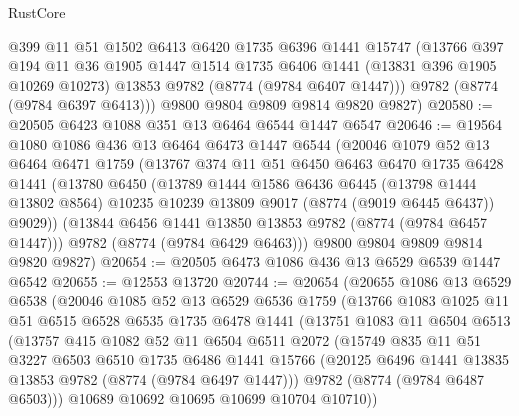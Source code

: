 \begin{lexlean}{RustCore}
\begin{coremodule}
        @399
        @11
        @51
        @1502
        @6413
        @6420
        @1735
        @6396
        @1441
        @15747
        (@13766
          @397
          @194
          @11
          @36
          @1905
          @1447
          @1514
          @1735
          @6406
          @1441
          (@13831 @396 @1905 @10269 @10273)
          @13853
          @9782
          (@8774 (@9784 @6407 @1447)))
        @9782
        (@8774 (@9784 @6397 @6413)))
      @9800
      @9804
      @9809
      @9814
      @9820
      @9827)
@20580 := @20505 @6423 @1088 @351 @13 @6464 @6544 @1447 @6547
@20646 := @19564
    @1080
    @1086
    @436
    @13
    @6464
    @6473
    @1447
    @6544
    (@20046
      @1079
      @52
      @13
      @6464
      @6471
      @1759
      (@13767
        @374
        @11
        @51
        @6450
        @6463
        @6470
        @1735
        @6428
        @1441
        (@13780
          @6450
          (@13789
            @1444
            @1586
            @6436
            @6445
            (@13798 @1444 @13802 @8564)
            @10235
            @10239
            @13809
            @9017
            (@8774 (@9019 @6445 @6437))
            @9029))
        (@13844 @6456 @1441 @13850 @13853 @9782 (@8774 (@9784 @6457 @1447)))
        @9782
        (@8774 (@9784 @6429 @6463)))
      @9800
      @9804
      @9809
      @9814
      @9820
      @9827)
@20654 := @20505 @6473 @1086 @436 @13 @6529 @6539 @1447 @6542
@20655 := @12553 @13720
@20744 := @20654
    (@20655
      @1086
      @13
      @6529
      @6538
      (@20046
        @1085
        @52
        @13
        @6529
        @6536
        @1759
        (@13766
          @1083
          @1025
          @11
          @51
          @6515
          @6528
          @6535
          @1735
          @6478
          @1441
          (@13751
            @1083
            @11
            @6504
            @6513
            (@13757
              @415
              @1082
              @52
              @11
              @6504
              @6511
              @2072
              (@15749
                @835
                @11
                @51
                @3227
                @6503
                @6510
                @1735
                @6486
                @1441
                @15766
                (@20125 @6496 @1441 @13835 @13853 @9782 (@8774 (@9784 @6497 @1447)))
                @9782
                (@8774 (@9784 @6487 @6503)))
              @10689
              @10692
              @10695
              @10699
              @10704
              @10710))

\end{coremodule}
\end{lexlean}
